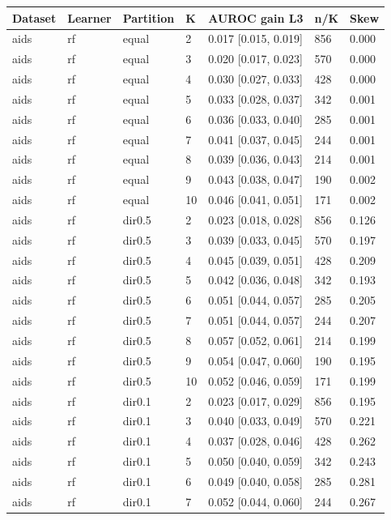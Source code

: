 \begin{tabular}{lllllll}
\toprule
Dataset & Learner & Partition & K & AUROC gain L3 & n/K & Skew \\
\midrule
aids & rf & equal & 2 & 0.017 [0.015, 0.019] & 856 & 0.000 \\
aids & rf & equal & 3 & 0.020 [0.017, 0.023] & 570 & 0.000 \\
aids & rf & equal & 4 & 0.030 [0.027, 0.033] & 428 & 0.000 \\
aids & rf & equal & 5 & 0.033 [0.028, 0.037] & 342 & 0.001 \\
aids & rf & equal & 6 & 0.036 [0.033, 0.040] & 285 & 0.001 \\
aids & rf & equal & 7 & 0.041 [0.037, 0.045] & 244 & 0.001 \\
aids & rf & equal & 8 & 0.039 [0.036, 0.043] & 214 & 0.001 \\
aids & rf & equal & 9 & 0.043 [0.038, 0.047] & 190 & 0.002 \\
aids & rf & equal & 10 & 0.046 [0.041, 0.051] & 171 & 0.002 \\
aids & rf & dir0.5 & 2 & 0.023 [0.018, 0.028] & 856 & 0.126 \\
aids & rf & dir0.5 & 3 & 0.039 [0.033, 0.045] & 570 & 0.197 \\
aids & rf & dir0.5 & 4 & 0.045 [0.039, 0.051] & 428 & 0.209 \\
aids & rf & dir0.5 & 5 & 0.042 [0.036, 0.048] & 342 & 0.193 \\
aids & rf & dir0.5 & 6 & 0.051 [0.044, 0.057] & 285 & 0.205 \\
aids & rf & dir0.5 & 7 & 0.051 [0.044, 0.057] & 244 & 0.207 \\
aids & rf & dir0.5 & 8 & 0.057 [0.052, 0.061] & 214 & 0.199 \\
aids & rf & dir0.5 & 9 & 0.054 [0.047, 0.060] & 190 & 0.195 \\
aids & rf & dir0.5 & 10 & 0.052 [0.046, 0.059] & 171 & 0.199 \\
aids & rf & dir0.1 & 2 & 0.023 [0.017, 0.029] & 856 & 0.195 \\
aids & rf & dir0.1 & 3 & 0.040 [0.033, 0.049] & 570 & 0.221 \\
aids & rf & dir0.1 & 4 & 0.037 [0.028, 0.046] & 428 & 0.262 \\
aids & rf & dir0.1 & 5 & 0.050 [0.040, 0.059] & 342 & 0.243 \\
aids & rf & dir0.1 & 6 & 0.049 [0.040, 0.058] & 285 & 0.281 \\
aids & rf & dir0.1 & 7 & 0.052 [0.044, 0.060] & 244 & 0.267 \\

\end{tabular}
